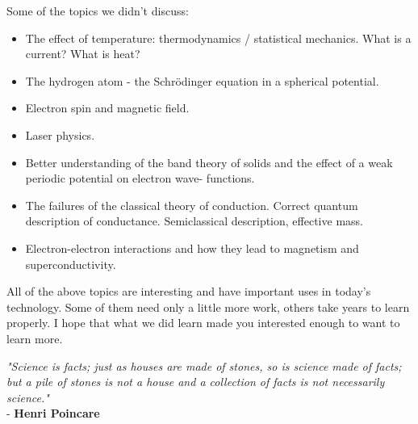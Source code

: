 \documentclass{Textbook}
\begin{document}
\noindent Some of the topics we didn't discuss:
\begin{itemize}
\item The effect of temperature: thermodynamics / statistical mechanics. What is a current? What is heat?
\item The hydrogen atom - the Schr{\"o}dinger equation in a spherical potential.
\item Electron spin and magnetic field.
\item Laser physics.
\item Better understanding of the band theory of solids and the effect of a weak periodic potential on electron wave-
functions.
\item The failures of the classical theory of conduction. Correct quantum description of conductance. Semiclassical description, effective mass.
\item Electron-electron interactions and how they lead to magnetism and superconductivity.
\end{itemize}
All of the above topics are interesting and have important uses in today's technology. Some of them need only a little more work, others take years to learn properly. I hope that what we did learn made you interested enough to want to learn more.

\textsl{"Science is facts; just as houses are made of stones, so is science made of facts; but a pile of stones is not a house and a collection of facts is not necessarily science."}\\
 - \textbf{Henri Poincare}






%
%
%
\end{document}

